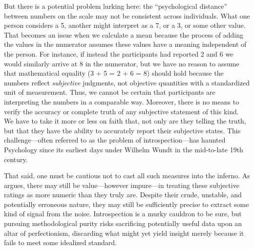 But there is a potential problem lurking here: the ``psychological distance'' between numbers on the scale may not be consistent across individuals. What one person considers a 5, another might interpret as a 7, or a 3, or some other value. That becomes an issue when we calculate a mean because the process of adding the values in the numerator assumes these values have a meaning independent of the person. For instance, if instead the participants had reported 2 and 6 we would similarly arrive at 8 in the numerator, but we have no reason to assume that mathematical equality (3 + 5 = 2 + 6 = 8) should hold because the numbers reflect \textit{subjective} judgments, not objective quantities with a standardized unit of measurement. Thus, we cannot be certain that participants are interpreting the numbers in a comparable way. Moreover, there is no means to verify the accuracy or complete truth of any subjective statement of this kind. We have to take it more or less on faith that, not only are they telling the truth, but that they have the ability to accurately report their subjective states. This challenge—often referred to as the problem of introspection—has haunted Psychology since its earliest days under Wilhelm Wundt in the mid-to-late 19th century. 

That said, one must be cautious not to cast all such measures into the inferno. As \textcite{Labovitz1967} argues, there may still be value—however impure—in treating these subjective ratings as more numeric than they truly are. Despite their crude, unstable, and potentially erroneous nature, they may still be sufficiently precise to extract some kind of signal from the noise. Introspection is a murky cauldron to be sure, but pursuing methodological purity risks sacrificing potentially useful data upon an altar of perfectionism, discarding what might yet yield insight merely because it fails to meet some idealized standard.







